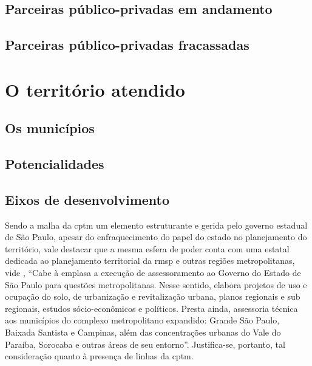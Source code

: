 \documentclass[11pt,fleqn]{book} %
\begin{document}
\section{Parceiras público-privadas em andamento}

\lipsum[3-4]

\section{Parceiras público-privadas fracassadas}

\lipsum[3-4]

\chapter{O território atendido}

\section{Os municípios}

\lipsum[3-4]

\section{Potencialidades}

\lipsum[3-4]

\section{Eixos de desenvolvimento}

Sendo a malha da \gls{cptm} um elemento estruturante e gerida pelo governo estadual de São Paulo, apesar do enfraquecimento do papel do estado no planejamento do território, vale destacar que a mesma esfera de poder conta com uma estatal dedicada ao planejamento territorial da \gls{rmsp} e outras regiões metropolitanas, vide \cite[p. 224]{Stefani}, ``Cabe à \gls{emplasa} a execução de assessoramento ao Governo do Estado de São Paulo para questões metropolitanas. Nesse sentido, elabora projetos de uso e ocupação do solo, de urbanização e revitalização urbana, planos regionais e sub regionais, estudos sócio-econômicos e políticos. Presta ainda, assessoria técnica aos municípios do complexo metropolitano expandido: Grande São Paulo, Baixada Santista e Campinas, além das concentrações urbanas do Vale do Paraíba, Sorocaba e outras áreas de seu entorno''. Justifica-se, portanto, tal consideração quanto à presença de linhas da \gls{cptm}.
\end{document}

